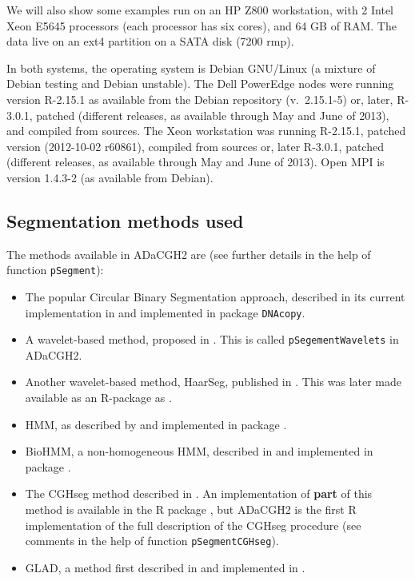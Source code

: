 \documentclass[a4paper,11pt]{article}
\begin{document}
  
We will also show some examples run on an HP Z800 workstation, with 2
Intel Xeon E5645 processors (each processor has six cores), and 64 GB of
RAM. The data live on an ext4 partition on a SATA disk (7200 rmp). %


In both systems, the operating system is Debian GNU/Linux (a mixture of
Debian testing and Debian unstable). The Dell PowerEdge nodes were running
version R-2.15.1 as available from the Debian repository (v.\ 2.15.1-5)
or, later, R-3.0.1, patched (different releases, as available through May
and June of 2013), and compiled from sources. The Xeon workstation was
running R-2.15.1, patched version (2012-10-02 r60861), compiled from
sources or, later R-3.0.1, patched (different releases, as available
through May and June of 2013). Open MPI is version 1.4.3-2 (as available
from Debian).


\subsection{Segmentation methods used}\label{methods}

The methods available in ADaCGH2 are (see further details in the help of
function \texttt{pSegment}):

\begin{itemize}

\item The popular Circular Binary Segmentation approach, described in its
  current implementation in \cite{CBS-paper} and implemented in package
  \texttt{DNAcopy}.

\item A wavelet-based method, proposed in \cite{waves-hsu}. This is called
  \texttt{pSegementWavelets} in ADaCGH2. 

\item Another wavelet-based method, HaarSeg, published in
  \cite{haarseg-paper}. This was later made available as an R-package as
  \cite{haar-package}.


\item HMM, as described by \cite{hmm-fridlyand} and implemented in package
  \cite{aCGHpackage}. 

\item BioHMM, a non-homogeneous HMM, described in \cite{biohmm} and
  implemented in package \cite{snapCGH}. 


\item The CGHseg method described in \cite{cghseg}. An implementation of
  \textbf{part} of this method is available in the R package
  \cite{tilingarray}, but ADaCGH2 is the first R implementation of the
  full description of the CGHseg procedure (see comments in the help of
  function \texttt{pSegmentCGHseg}).


\item GLAD, a method first described in \cite{glad-paper} and implemented
  in \cite{glad-package}.

\end{itemize}
\end{document}
